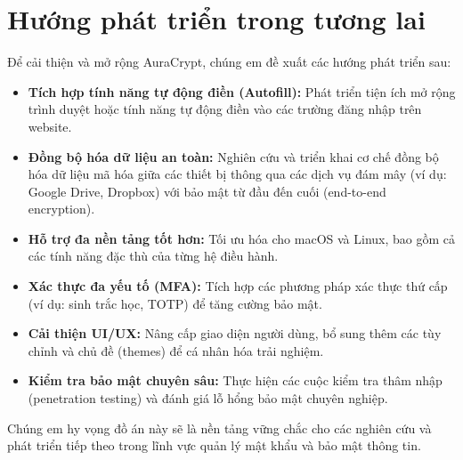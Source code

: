 \section{Hướng phát triển trong tương lai}
Để cải thiện và mở rộng AuraCrypt, chúng em đề xuất các hướng phát triển sau:
\begin{itemize}
    \item \textbf{Tích hợp tính năng tự động điền (Autofill):} Phát triển tiện ích mở rộng trình duyệt hoặc tính năng tự động điền vào các trường đăng nhập trên website.
    \item \textbf{Đồng bộ hóa dữ liệu an toàn:} Nghiên cứu và triển khai cơ chế đồng bộ hóa dữ liệu mã hóa giữa các thiết bị thông qua các dịch vụ đám mây (ví dụ: Google Drive, Dropbox) với bảo mật từ đầu đến cuối (end-to-end encryption).
    \item \textbf{Hỗ trợ đa nền tảng tốt hơn:} Tối ưu hóa cho macOS và Linux, bao gồm cả các tính năng đặc thù của từng hệ điều hành.
    \item \textbf{Xác thực đa yếu tố (MFA):} Tích hợp các phương pháp xác thực thứ cấp (ví dụ: sinh trắc học, TOTP) để tăng cường bảo mật.
    \item \textbf{Cải thiện UI/UX:} Nâng cấp giao diện người dùng, bổ sung thêm các tùy chỉnh và chủ đề (themes) để cá nhân hóa trải nghiệm.
    \item \textbf{Kiểm tra bảo mật chuyên sâu:} Thực hiện các cuộc kiểm tra thâm nhập (penetration testing) và đánh giá lỗ hổng bảo mật chuyên nghiệp.
\end{itemize}

Chúng em hy vọng đồ án này sẽ là nền tảng vững chắc cho các nghiên cứu và phát triển tiếp theo trong lĩnh vực quản lý mật khẩu và bảo mật thông tin.
\newpage